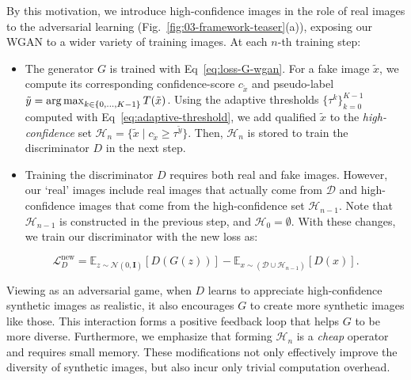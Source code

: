 \begin{foldable}
  By this motivation, we introduce high-confidence images in the role of real images to the adversarial learning (Fig.~\ref{fig:03-framework-teaser}(a)), exposing our WGAN to a wider variety of training images.
  At each $n$-th training step:
  \begin{itemize}
    \item {
        The generator $G$ is trained with Eq~\ref{eq:loss-G-wgan}.
        For a fake image $\tilde{x}$, we compute its corresponding confidence-score $c_{\tilde{x}}$ and pseudo-label $\tilde{y} = \operatorname*{arg\,max}_{k \in \{0, \ldots, K-1\}} T(\tilde{x})$.
        Using the adaptive thresholds $\{\tau^{k}\}_{k=0}^{K-1}$ computed with Eq~\ref{eq:adaptive-threshold}, we add qualified $\tilde{x}$ to the \textit{high-confidence} set $\mathcal{H}_{n} = \{\tilde{x} \mid c_{\tilde{x}} \geq \tau^{\tilde{y}}\}$.
        Then, $\mathcal{H}_{n}$ is stored to train the discriminator $D$ in the next step.
      }
    \item {
        Training the discriminator $D$ requires both real and fake images.
        However, our `real' images include real images that actually come from $\mathcal{D}$ and high-confidence images that come from the high-confidence set $\mathcal{H}_{n-1}$.
        Note that $\mathcal{H}_{n-1}$ is constructed in the previous step, and $\mathcal{H}_{0}=\emptyset$.
        With these changes, we train our discriminator with the new loss as:
      }
  \end{itemize}
  \begin{equation}
    \mathcal{L}_{D}^{\text{new}} = {
      \mathbb{E}_{z \sim \mathcal{N}(0, \mathbf{I})}[D(G(z))] -
      \mathbb{E}_{x \sim (\mathcal{D} \cup \mathcal{H}_{n-1})}[D(x)]
    }.
    \label{eq:loss-D-divbfkd}
  \end{equation}
\end{foldable}

\begin{foldable}
  Viewing as an adversarial game, when $D$ learns to appreciate high-confidence synthetic images as realistic, it also encourages $G$ to create more synthetic images like those.
  This interaction forms a positive feedback loop that helps $G$ to be more diverse.
  Furthermore, we emphasize that forming $\mathcal{H}_{n}$ is a \textit{cheap} operator and requires small memory.
  These modifications not only effectively improve the diversity of synthetic images, but also incur only trivial computation overhead.
\end{foldable}

